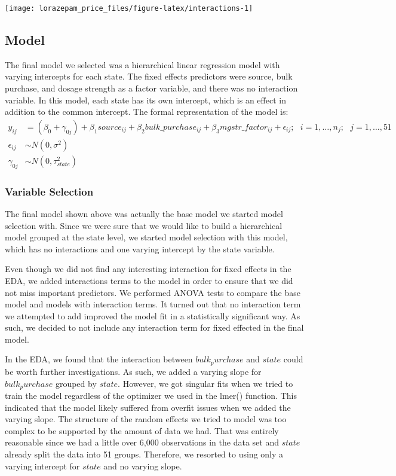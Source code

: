 \documentclass[
]{article}
\begin{document}
\begin{center}\texttt{[image: lorazepam\_price\_files/figure-latex/interactions-1]} \end{center}

\hypertarget{model}{%
\subsection{Model}\label{model}}

The final model we selected was a hierarchical linear regression model
with varying intercepts for each state. The fixed effects predictors
were source, bulk purchase, and dosage strength as a factor variable,
and there was no interaction variable. In this model, each state has its
own intercept, which is an effect in addition to the common intercept.
The formal representation of the model is: \[
\begin{aligned}
y_{ij} & = (\beta_{0} + \gamma_{0j}) + \beta_1 source_{ij} + \beta_2 bulk\_purchase_{ij} + \beta_3 mgstr\_factor_{ij} + \epsilon_{ij}; \ \ \ i = 1, \ldots, n_j; \ \ \ j = 1, \ldots, 51 \\
\epsilon_{ij} & \sim N(0, \sigma^2) \\
\gamma_{0j} & \sim N(0, \tau_{state}^2)
\end{aligned}
\]

\hypertarget{variable-selection}{%
\subsubsection{Variable Selection}\label{variable-selection}}

The final model shown above was actually the base model we started model
selection with. Since we were sure that we would like to build a
hierarchical model grouped at the state level, we started model
selection with this model, which has no interactions and one varying
intercept by the state variable.

Even though we did not find any interesting interaction for fixed
effects in the EDA, we added interactions terms to the model in order to
ensure that we did not miss important predictors. We performed ANOVA
tests to compare the base model and models with interaction terms. It
turned out that no interaction term we attempted to add improved the
model fit in a statistically significant way. As such, we decided to not
include any interaction term for fixed effected in the final model.

In the EDA, we found that the interaction between \(bulk_purchase\) and
\(state\) could be worth further investigations. As such, we added a
varying slope for \(bulk_purchase\) grouped by \(state\). However, we
got singular fits when we tried to train the model regardless of the
optimizer we used in the lmer() function. This indicated that the model
likely suffered from overfit issues when we added the varying slope. The
structure of the random effects we tried to model was too complex to be
supported by the amount of data we had. That was entirely reasonable
since we had a little over 6,000 observations in the data set and
\(state\) already split the data into 51 groups. Therefore, we resorted
to using only a varying intercept for \(state\) and no varying slope.
\end{document}

